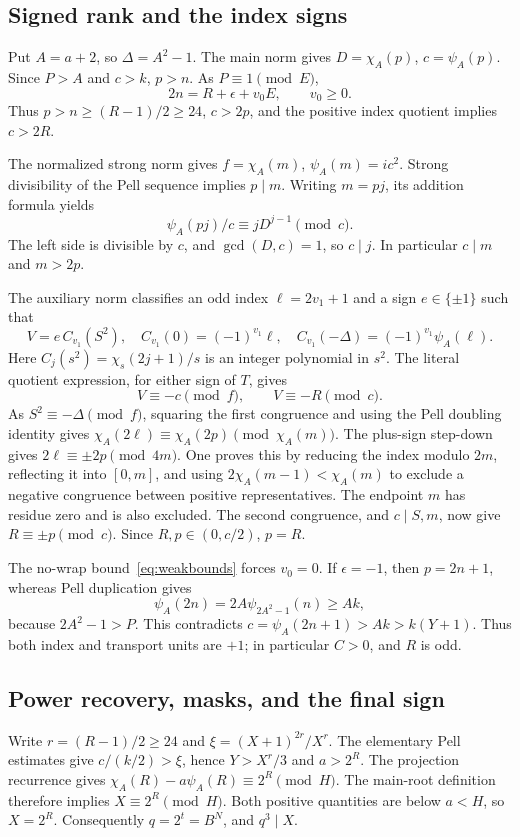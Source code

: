 \documentclass[11pt,a4paper]{article}
\theoremstyle{remark}\newtheorem{remark}[theorem]{Remark}
\begin{document}
\subsection{Signed rank and the index signs}

Put \(A=a+2\), so \(\Delta=A^2-1\). The main norm gives
\(D=\chi_A(p)\), \(c=\psi_A(p)\). Since \(P>A\) and \(c>k\),
\(p>n\). As \(P\equiv1\pmod E\),
\[
 2n=R+\epsilon+v_0E,\qquad v_0\ge0.
\]
Thus \(p>n\ge(R-1)/2\ge24\), \(c>2p\), and the positive index
quotient implies \(c>2R\).

The normalized strong norm gives
\(f=\chi_A(m)\), \(\psi_A(m)=ic^2\).
Strong divisibility of the Pell sequence implies \(p\mid m\). Writing
\(m=pj\), its addition formula yields
\[
 \psi_A(pj)/c\equiv jD^{j-1}\pmod c.
\]
The left side is divisible by \(c\), and \(\gcd(D,c)=1\), so
\(c\mid j\). In particular \(c\mid m\) and \(m>2p\).

The auxiliary norm classifies an odd index \(\ell=2v_1+1\) and a sign
\(e\in\{\pm1\}\) such that
\[
 V=e\,C_{v_1}(S^2),\quad
 C_{v_1}(0)=(-1)^{v_1}\ell,\quad
 C_{v_1}(-\Delta)=(-1)^{v_1}\psi_A(\ell).
\]
Here \(C_j(s^2)=\chi_s(2j+1)/s\) is an integer polynomial in \(s^2\).
The literal quotient expression, for either sign of \(T\), gives
\[
 V\equiv-c\pmod f,\qquad V\equiv-R\pmod c.
\]
As \(S^2\equiv-\Delta\pmod f\), squaring the first congruence and
using the Pell doubling identity gives
\(\chi_A(2\ell)\equiv\chi_A(2p)\pmod{\chi_A(m)}\).
The plus-sign step-down gives
\(2\ell\equiv\pm2p\pmod{4m}\). One proves this by reducing the
index modulo \(2m\), reflecting it into \([0,m]\), and using
\(2\chi_A(m-1)<\chi_A(m)\) to exclude a negative congruence between
positive representatives. The endpoint \(m\) has residue zero and is
also excluded. The second congruence, and \(c\mid S,m\), now give
\(R\equiv\pm p\pmod c\). Since \(R,p\in(0,c/2)\), \(p=R\).

The no-wrap bound~\eqref{eq:weakbounds} forces \(v_0=0\). If
\(\epsilon=-1\), then \(p=2n+1\), whereas Pell duplication gives
\[
 \psi_A(2n)=2A\psi_{2A^2-1}(n)\ge Ak,
\]
because \(2A^2-1>P\). This contradicts
\(c=\psi_A(2n+1)>Ak>k(Y+1)\). Thus both index and transport units are
\(+1\); in particular \(C>0\), and \(R\) is odd.

\subsection{Power recovery, masks, and the final sign}

Write \(r=(R-1)/2\ge24\) and
\(\xi=(X+1)^{2r}/X^r\). The elementary Pell estimates give
\(c/(k/2)>\xi\), hence \(Y>X^r/3\) and \(a>2^R\).
The projection recurrence gives
\(\chi_A(R)-a\psi_A(R)\equiv2^R\pmod H\).
The main-root definition therefore implies \(X\equiv2^R\pmod H\).
Both positive quantities are below \(a<H\), so \(X=2^R\).
Consequently \(q=2^t=B^N\), and \(q^3\mid X\).
\end{document}
